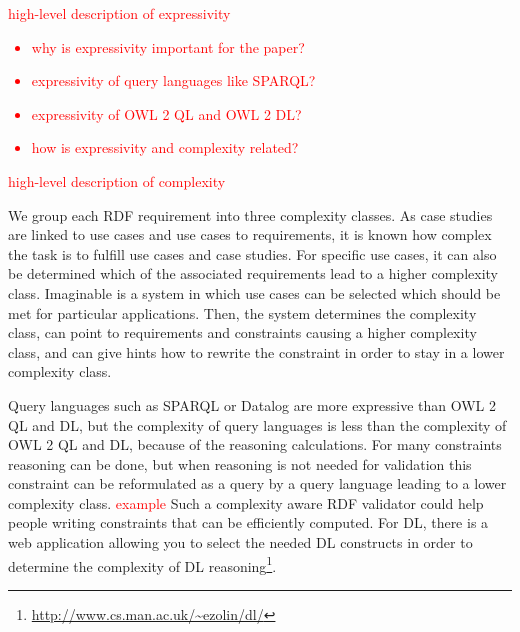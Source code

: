 \documentclass{llncs}
\begin{document}
%


\textcolor{red}{high-level description of expressivity}

\textcolor{red}{
\begin{itemize}
  \item why is expressivity important for the paper?
	\item expressivity of query languages like SPARQL?
	\item expressivity of OWL 2 QL and OWL 2 DL?
	\item how is expressivity and complexity related?
\end{itemize}
}

\textcolor{red}{high-level description of complexity}

We group each RDF requirement into three complexity classes.
As case studies are linked to use cases and use cases to requirements, it is known how complex the task is to fulfill use cases and case studies.
For specific use cases, it can also be determined which of the associated requirements lead to a higher complexity class.
Imaginable is a system in which use cases can be selected which should be met for particular applications.
Then, the system determines the complexity class, can point to requirements and constraints causing a higher complexity class,
and can give hints how to rewrite the constraint in order to stay in a lower complexity class.   

Query languages such as SPARQL or Datalog are more expressive than OWL 2 QL and DL,
but the complexity of query languages is less than the complexity of OWL 2 QL and DL, because of the reasoning calculations.
For many constraints reasoning can be done, but when reasoning is not needed for validation this constraint can be reformulated as a query by a query language
leading to a lower complexity class. 
\textcolor{red}{example}
Such a complexity aware RDF validator could help people writing constraints that can be efficiently computed.
For DL, there is a web application allowing you to select the needed DL constructs in order to determine the complexity of DL reasoning\footnote{\url{http://www.cs.man.ac.uk/~ezolin/dl/}}.
\end{document}

